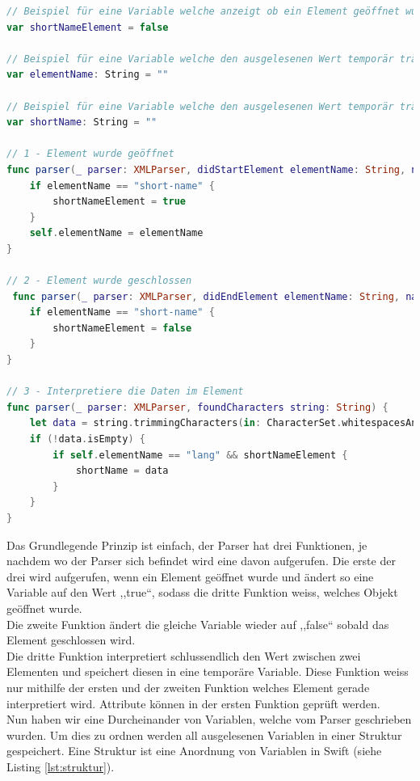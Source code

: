 \documentclass[12pt]{article}
\begin{document}
\begin{lstlisting}[language=Swift,caption={XML-Parser in Swift},label={lst:xmlParser}]
// Beispiel für eine Variable welche anzeigt ob ein Element geöffnet wurde oder nicht.
var shortNameElement = false

// Beispiel für eine Variable welche den ausgelesenen Wert temporär trägt
var elementName: String = ""

// Beispiel für eine Variable welche den ausgelesenen Wert temporär trägt und später in eine Struktur übertragen wird
var shortName: String = ""
  
// 1 - Element wurde geöffnet
func parser(_ parser: XMLParser, didStartElement elementName: String, namespaceURI: String?, qualifiedName qName: String?, attributes attributeDict: [String : String] = [:]) {
    if elementName == "short-name" {
        shortNameElement = true
    }
    self.elementName = elementName
}
    
// 2 - Element wurde geschlossen
 func parser(_ parser: XMLParser, didEndElement elementName: String, namespaceURI: String?, qualifiedName qName: String?) {
    if elementName == "short-name" {
        shortNameElement = false
    }
}
      
// 3 - Interpretiere die Daten im Element
func parser(_ parser: XMLParser, foundCharacters string: String) {
    let data = string.trimmingCharacters(in: CharacterSet.whitespacesAndNewlines)
    if (!data.isEmpty) {
        if self.elementName == "lang" && shortNameElement {
            shortName = data
        } 
    }
}
\end{lstlisting}
Das Grundlegende Prinzip ist einfach, der Parser hat drei Funktionen, je nachdem wo der Parser sich befindet wird eine davon aufgerufen. Die erste der drei wird aufgerufen, wenn ein Element geöffnet wurde und ändert so eine Variable auf den Wert ,,true``, sodass die dritte Funktion weiss, welches Objekt geöffnet wurde. \\ Die zweite Funktion ändert die gleiche Variable wieder auf ,,false`` sobald das Element geschlossen wird. \\ Die dritte Funktion interpretiert schlussendlich den Wert zwischen zwei Elementen und speichert diesen  in eine temporäre Variable. Diese Funktion weiss nur mithilfe der ersten und der zweiten Funktion welches Element gerade interpretiert wird. Attribute können in der ersten Funktion geprüft werden. \cite{xmlParserIosCreator} \\
Nun haben wir eine Durcheinander von Variablen, welche vom Parser geschrieben wurden. Um dies zu ordnen werden all ausgelesenen Variablen in einer Struktur gespeichert. Eine Struktur ist eine Anordnung von Variablen in Swift (siehe Listing \ref{lst:struktur}).
\end{document}
